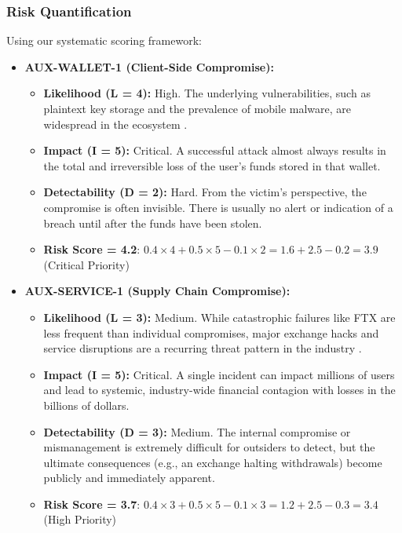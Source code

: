 \subsubsection{Risk Quantification}

Using our systematic scoring framework:

\begin{itemize}
    \item \textbf{AUX-WALLET-1 (Client-Side Compromise):}
    \begin{itemize}
        \item \textbf{Likelihood (L = 4):} High. The underlying vulnerabilities, such as plaintext key storage and the prevalence of mobile malware, are widespread in the ecosystem \cite{houy2023}.
        \item \textbf{Impact (I = 5):} Critical. A successful attack almost always results in the total and irreversible loss of the user's funds stored in that wallet.
        \item \textbf{Detectability (D = 2):} Hard. From the victim's perspective, the compromise is often invisible. There is usually no alert or indication of a breach until after the funds have been stolen.
        \item \textbf{Risk Score = 4.2}: $0.4 \times 4 + 0.5 \times 5 - 0.1 \times 2 = 1.6 + 2.5 - 0.2 = 3.9$ (Critical Priority)
    \end{itemize}
    
    \item \textbf{AUX-SERVICE-1 (Supply Chain Compromise):}
    \begin{itemize}
        \item \textbf{Likelihood (L = 3):} Medium. While catastrophic failures like FTX are less frequent than individual compromises, major exchange hacks and service disruptions are a recurring threat pattern in the industry \cite{houy2023}.
        \item \textbf{Impact (I = 5):} Critical. A single incident can impact millions of users and lead to systemic, industry-wide financial contagion with losses in the billions of dollars.
        \item \textbf{Detectability (D = 3):} Medium. The internal compromise or mismanagement is extremely difficult for outsiders to detect, but the ultimate consequences (e.g., an exchange halting withdrawals) become publicly and immediately apparent.
        \item \textbf{Risk Score = 3.7}: $0.4 \times 3 + 0.5 \times 5 - 0.1 \times 3 = 1.2 + 2.5 - 0.3 = 3.4$ (High Priority)
    \end{itemize}
\end{itemize}